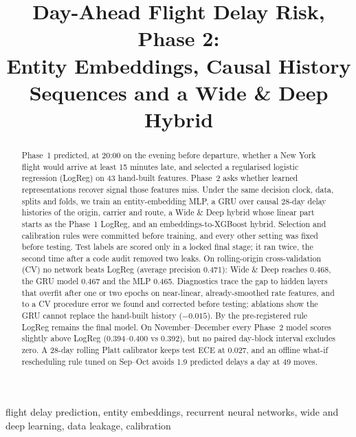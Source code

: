 \documentclass[conference]{IEEEtran}
\begin{document}
\title{Day-Ahead Flight Delay Risk, Phase 2:\\
Entity Embeddings, Causal History Sequences and a Wide \& Deep Hybrid}

\author{
}

\maketitle

\begin{abstract}
Phase~1 predicted, at 20:00 on the evening before departure, whether a New York flight would arrive at least 15 minutes late, and selected a regularised logistic regression (LogReg) on 43 hand-built features. Phase~2 asks whether learned representations recover signal those features miss. Under the same decision clock, data, splits and folds, we train an entity-embedding MLP, a GRU over causal 28-day delay histories of the origin, carrier and route, a Wide \& Deep hybrid whose linear part starts as the Phase~1 LogReg, and an embeddings-to-XGBoost hybrid. Selection and calibration rules were committed before training, and every other setting was fixed before testing. Test labels are scored only in a locked final stage; it ran twice, the second time after a code audit removed two leaks. On rolling-origin cross-validation (CV) no network beats LogReg (average precision 0.471): Wide \& Deep reaches 0.468, the GRU model 0.467 and the MLP 0.465. Diagnostics trace the gap to hidden layers that overfit after one or two epochs on near-linear, already-smoothed rate features, and to a CV procedure error we found and corrected before testing; ablations show the GRU cannot replace the hand-built history ($-0.015$). By the pre-registered rule LogReg remains the final model. On November--December every Phase~2 model scores slightly above LogReg (0.394--0.400 vs 0.392), but no paired day-block interval excludes zero. A 28-day rolling Platt calibrator keeps test ECE at 0.027, and an offline what-if rescheduling rule tuned on Sep--Oct avoids 1.9 predicted delays a day at 49 moves.
\end{abstract}

\begin{IEEEkeywords}
flight delay prediction, entity embeddings, recurrent neural networks, wide and deep learning, data leakage, calibration
\end{IEEEkeywords}
\end{document}
